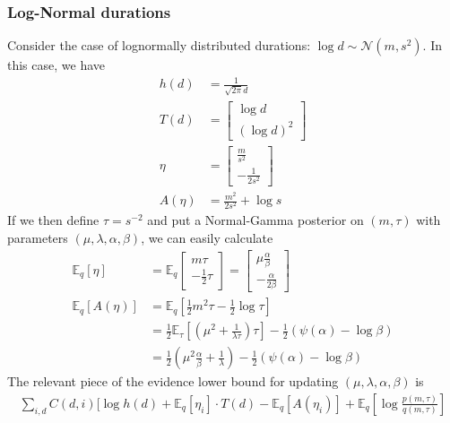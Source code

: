 \documentclass[11pt]{article}
\begin{document}
\subsubsection{Log-Normal durations}
Consider the case of lognormally distributed durations: $\log d \sim \mathcal{N}(m, s^2)$. In this case, we have
\begin{align}
    h(d) &= \frac{1}{\sqrt{2\pi} d} \\
    T(d) &= \begin{bmatrix}
    \log d \\
    (\log d) ^2
    \end{bmatrix} \\
    \eta &= \begin{bmatrix}
    \frac{m}{s^2} \\
    -\frac{1}{2s^2}
    \end{bmatrix} \\
    A(\eta) &= \frac{m^2}{2s^2} + \log s
\end{align}
If we then define $\tau = s^{-2}$ and put a Normal-Gamma posterior on $(m, \tau)$ with parameters $(\mu, \lambda, \alpha, \beta)$, we can easily calculate
\begin{align}
    \mathbb{E}_q[\eta] &= \mathbb{E}_q
    \begin{bmatrix}
    m\tau \\
    -\frac{1}{2}\tau
    \end{bmatrix} =
    \begin{bmatrix}
    \mu\frac{\alpha}{\beta} \\
    -\frac{\alpha}{2\beta}
    \end{bmatrix} \\
    \mathbb{E}_q[A(\eta)] &= \mathbb{E}_q\left[
    \frac{1}{2}m^2\tau - \frac{1}{2} \log \tau
    \right] \\
    &= \frac{1}{2} \mathbb{E}_\tau\left[
    \left(\mu^2 + \frac{1}{\lambda \tau}\right)\tau
    \right]
    -\frac{1}{2} (\psi(\alpha) - \log \beta) \\
    &= \frac{1}{2} \left(\mu^2 \frac{\alpha}{\beta} + \frac{1}{\lambda} \right)
    -\frac{1}{2} (\psi(\alpha) - \log \beta)
\end{align}
The relevant piece of the evidence lower bound for updating $(\mu, \lambda, \alpha, \beta)$ is
\begin{multline}
    \sum_{i, d} C(d, i) [ \log h(d) + \mathbb{E}_q[\eta_i] \cdot T(d) -
    \mathbb{E}_q[A(\eta_i)] + \mathbb{E}_q\left[\log \frac{p(m, \tau)}{q(m, \tau)} \right]
\end{multline}
\end{document}
